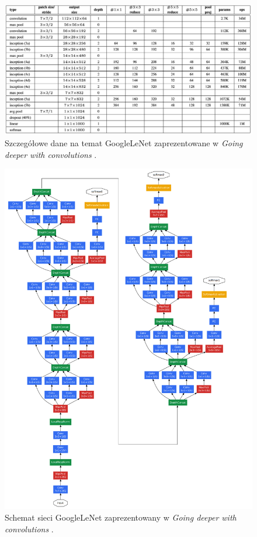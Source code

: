 \begin{figure}[ht]
\centerline{\includegraphics[scale=0.3]{resources/inception/googleNet-table.png}}
\caption{Szczegółowe dane na temat GoogleLeNet zaprezentowane w \textit{Going deeper with convolutions} \cite{inceptionpaper}.} 
\label{fig:googleNettable}
\end{figure}

\begin{figure}[ht]
\centerline{\includegraphics[scale=0.3]{resources/inception/googleNet.png}}
\caption{Schemat sieci GoogleLeNet zaprezentowany w \textit{Going deeper with convolutions} \cite{inceptionpaper}.} 
\label{fig:googleNet}
\end{figure}

